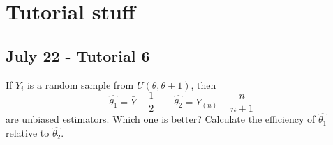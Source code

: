 \documentclass{article}
\begin{document}
\cover
\toc
\blurb


\setcounter{subsection}{5}

\section{Tutorial stuff}
\subsection{July 22 - Tutorial 6}

\begin{qu}
If $ Y_{i} $ is a random sample from $ U(\theta, \theta + 1) $, then
\begin{equation*}
\hat{\theta_{1}} = \bar{Y} - \dfrac{1}{2} \qquad \hat{\theta_{2}} = Y_{(n)} - \dfrac{n}{n + 1}
\end{equation*}
are unbiased estimators. Which one is better? Calculate the efficiency of $ \hat{\theta_{1}} $ relative to $ \hat{\theta_{2}} $.
\end{qu}
\end{document}
